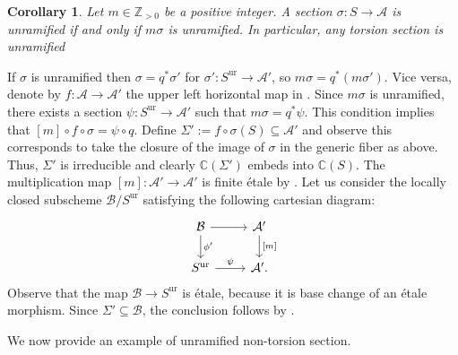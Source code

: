 \documentclass[10 pt,a4paper]{article}
\theoremstyle{plain}
\newtheorem{cor}[thm]{Corollary}
\theoremstyle{definition}
\theoremstyle{named}
\DeclareMathOperator{\ur}{ur}
\newcommand{\cA}{\mathcal A}
\newcommand{\bC}{\mathbb C}
\newcommand{\bZ}{\mathbb Z}
\begin{document}

\begin{cor}\label{cor:divisible_ram}
Let $m \in \bZ_{>0}$ be a positive integer. A section $\sigma:S \to \cA$ is unramified if and only if $m\sigma$ is unramified. In particular, any torsion section is unramified
\end{cor}
\proof
If $\sigma$ is unramified then $\sigma=q^\ast\sigma'$ for $\sigma'\colon S^{\ur}\to\cA'$, so $m\sigma=q^\ast(m\sigma')$. Vice versa, denote by $f:\cA \to \cA'$ the upper left horizontal map in . Since $m\sigma$ is unramified, there exists a section $\psi:S^{\ur} \to \cA'$ such that $m\sigma=q^\ast\psi$. This condition implies that $[m]\circ f\circ\sigma=\psi\circ q$. Define $\Sigma':=f\circ\sigma(S)\subseteq \cA'$ and observe this corresponds to take the closure of the image of $\sigma$ in the generic fiber as above. Thus, $\Sigma'$ is irreducible and clearly $\bC(\Sigma')$ embeds into $\bC(S)$. The multiplication map $[m]:\cA' \to \cA'$ is  finite étale  by \cite[V, Proposition 20.7]{Cor_Sil}. Let us consider the locally closed subscheme $\mathcal B/S^{\ur}$ satisfying the following cartesian diagram:
\[
\begin{tikzcd}
    \mathcal B \arrow{r} \arrow{d}{\phi'} & \cA' \arrow{d}{[m]}\\
    S^{\ur} \arrow{r}{\psi} & \cA'.
\end{tikzcd}
\]
Observe that the map $\mathcal B \to S^{\ur}$ is étale, because it is base change of an étale morphism. Since $\Sigma' \subseteq \mathcal B$, the conclusion follows by .
\endproof

We now provide an example of unramified non-torsion section.
\end{document}
